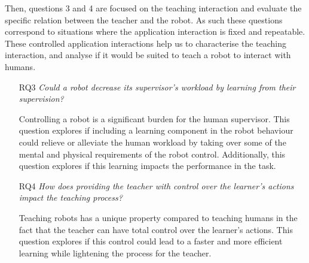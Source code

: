 Then, questions 3 and 4 are focused on the teaching interaction and evaluate the specific relation between the teacher and the robot. As such these questions correspond to situations where the application interaction is fixed and repeatable. These controlled application interactions help us to characterise the teaching interaction, and analyse if it would be suited to teach a robot to interact with humans.
\begin{itemize}
    \item [RQ3] \emph{Could a robot decrease its supervisor's workload by learning from their supervision?}
    
        Controlling a robot is a significant burden for the human supervisor. This question explores if including a learning component in the robot behaviour could relieve or alleviate the human workload by taking over some of the mental and physical requirements of the robot control. Additionally, this question explores if this learning impacts the performance in the task.
    
    \item [RQ4] \emph{How does providing the teacher with control over the learner's actions impact the teaching process?} 
    
    	Teaching robots has a unique property compared to teaching humans in the fact that the teacher can have total control over the learner's actions. This question explores if this control could lead to a faster and more efficient learning while lightening the process for the teacher.
\end{itemize}    	

